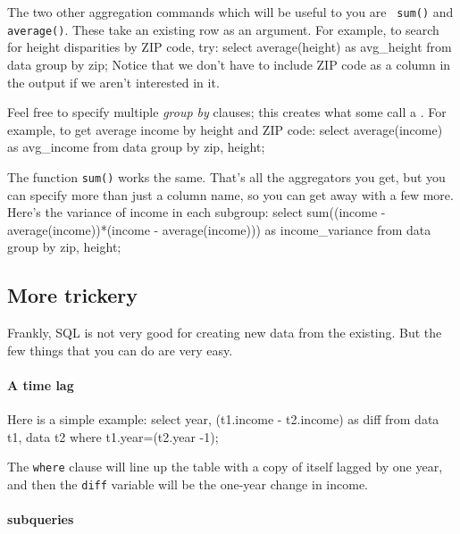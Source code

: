 The two other aggregation commands which will be useful to you are {\tt
sum()} and {\tt average()}. These take an existing row as an argument.
For example, to search for height disparities by ZIP code, try:
select  average(height) as avg_height
from data
group by zip;
Notice that we don't have to include ZIP code as a column in the output
if we aren't interested in it.

Feel free to specify multiple {\sl group by} clauses; this creates what
some call a . For example, to get average income by
height and ZIP code: 
select  average(income) as avg_income
from data
group by zip, height;

The function {\tt sum()} works the same. That's all the aggregators you
get, but you can specify more than just a column name, so you can get
away with a few more. Here's the variance of income in each subgroup:
select  sum((income - average(income))*(income - average(income))) 
               as income_variance
from data
group by zip, height;

\subsection{More trickery} Frankly, SQL is not very good for
creating new data from the existing. But the few things that you can do
are very easy.

\paragraph{A time lag} Here is a simple example:
select year, (t1.income - t2.income) as diff
   from data t1, data t2
   where t1.year=(t2.year -1);

The {\tt where} clause will line up the table with a copy of itself
lagged by one year, and then the {\tt diff} variable will be the
one-year change in income.


\paragraph{subqueries}

